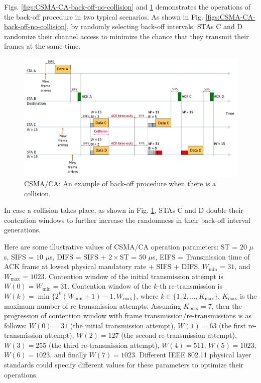 Figs. \ref{figs:CSMA-CA-back-off-no-collision} and \ref{figs:CSMA-CA-back-off-with-collision} demonstrates the operations of the back-off procedure in two typical scenarios. As shown in Fig. \ref{figs:CSMA-CA-back-off-no-collision}, by randomly selecting back-off intervals, STAs C and D randomize their channel access to minimize the chance that they transmit their frames at the same time. 
\begin{figure}[!t]
	\centering
	\includegraphics[width=\columnwidth]{figs/CSMA-CA-back-off-with-collision}
	\caption{CSMA/CA: An example of back-off procedure when there is a collision.}
	\label{figs:CSMA-CA-back-off-with-collision}
\end{figure}
In case a collision takes place, as shown in Fig. \ref{figs:CSMA-CA-back-off-with-collision}, STAs C and D double their contention windows to further increase the randomness in their back-off interval generations.

Here are some illustrative values of CSMA/CA operation parameters: ST = $20$ $\mu$s, SIFS = $10$ $\mu$s, DIFS = SIFS + $2\times$ST = $50$ $\mu$s, EIFS = Transmission time of ACK frame at lowest physical mandatory rate + SIFS + DIFS, $W_{\min}$ = $31$, and $W_{\max}$ = $1023$. Contention window of the initial transmission attempt is $W(0)=W_{\min}=31$. Contention window of the $k$-th re-transmission is $W(k)=\min\{2^{k}(W_{\min}+1)-1, W_{\max}\}$, where $k \in \{1,2, ..., K_{\max}\}$, $K_{\max}$ is the maximum number of re-transmission attempts. Assuming $K_{\max}=7$, then the progression of contention window with frame transmission/re-transmissions is as follows: $W(0)=31$ (the initial transmission attempt), $W(1)=63$ (the first re-transmission attempt), $W(2)=127$ (the second re-transmission attempt), $W(3)=255$ (the third re-transmission attempt), $W(4)=511$, $W(5)=1023$, $W(6)=1023$, and finally $W(7)=1023$. Different IEEE 802.11 physical layer standards could specify different values for these parameters to optimize their operations.

